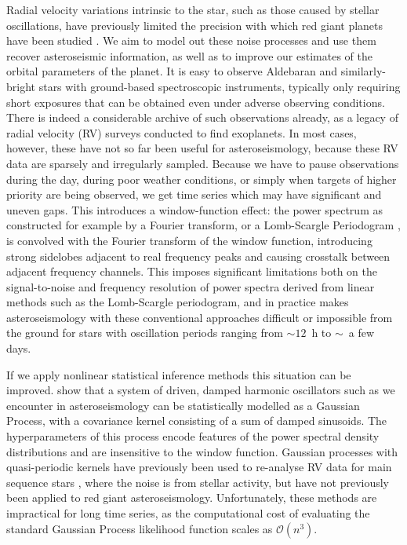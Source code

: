 \documentclass[modern]{aastex61}
\begin{document}
Radial velocity variations intrinsic to the star, such as those caused by stellar oscillations, have previously limited the precision with which red giant planets have been studied \citep{2005PASJ...57...97S}. We aim to model out these noise processes and use them recover asteroseismic information, as well as to improve our estimates of the orbital parameters of the planet. It is easy to observe Aldebaran and similarly-bright stars with ground-based spectroscopic instruments, typically only requiring short exposures that can be obtained even under adverse observing conditions. There is indeed a considerable archive of such observations already, as a legacy of radial velocity (RV) surveys conducted to find exoplanets. In most cases, however, these have not so far been useful for asteroseismology, because these RV data are sparsely and irregularly sampled. Because we have to pause observations during the day, during poor weather conditions, or simply when targets of higher priority are being observed, we get time series which may have significant and uneven gaps. This introduces a window-function effect: the power spectrum as constructed for example by a Fourier transform, or a Lomb-Scargle Periodogram \citep{lomb,scargle}, is convolved with the Fourier transform of the window function, introducing strong sidelobes adjacent to real frequency peaks and causing crosstalk between adjacent frequency channels. This imposes significant limitations both on the signal-to-noise and frequency resolution of power spectra derived from linear methods such as the Lomb-Scargle periodogram, and in practice makes asteroseismology with these conventional approaches difficult or impossible from the ground for stars with oscillation periods ranging from $\sim 12$~h to $\sim$~a few days.

If we apply nonlinear statistical inference methods this situation can be
improved. \citet{brewer2009} show that a system of driven, damped harmonic
oscillators such as we encounter in asteroseismology can be statistically
modelled as a Gaussian Process, with a covariance kernel consisting of a sum of
damped sinusoids. The hyperparameters of this process encode features of the
power spectral density distributions and are insensitive to the window function. Gaussian processes with quasi-periodic kernels have previously been used to re-analyse RV data for main sequence stars \citep{2014MNRAS.443.2517H,2015MNRAS.452.2269R}, where the noise is from stellar activity, but have not previously been applied to red giant asteroseismology.
Unfortunately, these methods are impractical for long time series, as the computational
cost of evaluating the standard Gaussian Process likelihood function scales as
$\mathcal{O}(n^3)$.
\end{document}
